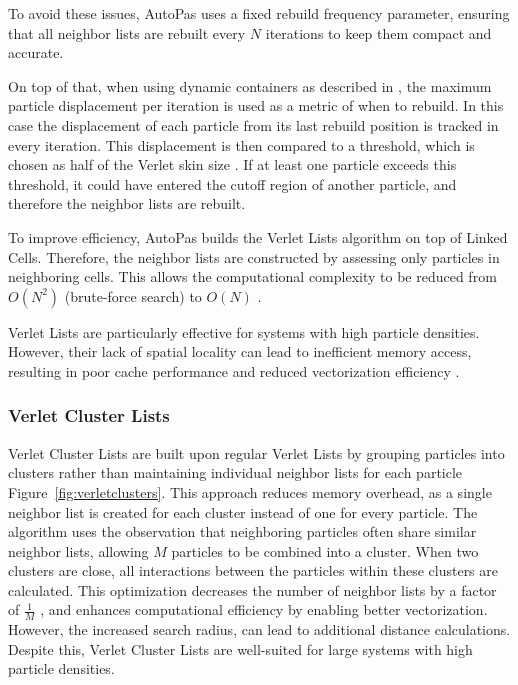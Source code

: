 To avoid these issues, AutoPas uses a fixed rebuild frequency parameter, ensuring that all neighbor lists are rebuilt every \(N\) iterations to keep them compact and accurate. 


On top of that, when using dynamic containers as described in \parencite{gall2023exploration}, the maximum particle displacement per iteration is used as a metric of when to rebuild. In this case the displacement of each particle from its last rebuild position is tracked in every iteration. This displacement is then compared to a threshold, which is chosen as half of the Verlet skin size \parencite{thompson2022lammps}. If at least one particle exceeds this threshold, it could have entered the cutoff region of another particle, and therefore the neighbor lists are rebuilt.


To improve efficiency, AutoPas builds the Verlet Lists algorithm on top of Linked Cells. Therefore, the neighbor lists are constructed by assessing only particles in neighboring cells. This allows the computational complexity to be reduced from \(O(N^2)\) (brute-force search) to \(O(N)\) \parencite{yao2004improved}. 

Verlet Lists are particularly effective for systems with high particle densities. However, their lack of spatial locality can lead to inefficient memory access, resulting in poor cache performance and reduced vectorization efficiency \parencite{gratl2022n}.


\subsubsection{Verlet Cluster Lists}

Verlet Cluster Lists are built upon regular Verlet Lists by grouping particles into clusters rather than maintaining individual neighbor lists for each particle Figure~\ref{fig:verletclusters}. This approach reduces memory overhead, as a single neighbor list is created for each cluster instead of one for every particle. The algorithm uses the observation that neighboring particles often share similar neighbor lists, allowing $M$ particles to be combined into a cluster. When two clusters are close, all interactions between the particles within these clusters are calculated. This optimization decreases the number of neighbor lists by a factor of $\frac{1}{M}$ \parencite{gratl2022n}, and enhances computational efficiency by enabling better vectorization. However, the increased search radius, can lead to additional distance calculations. Despite this, Verlet Cluster Lists are well-suited for large systems with high particle densities.

